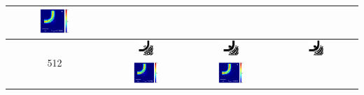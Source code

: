 \begin{table}[ht]
\begin{tabular}{|c|c|c|c|}
      \includegraphics[width=0.33\textwidth]{image/results/bend/L-BFGS-B/visualize_field_fab_256.png} \\
    \hline
      \multirow{2}{*}{512} &
      \includegraphics[width=0.20\textwidth]{image/results/bend/L-BFGS-B/visualize_eps_cont_512.png} &
      \includegraphics[width=0.20\textwidth]{image/results/bend/L-BFGS-B/visualize_eps_disc_512.png} &
      \includegraphics[width=0.20\textwidth]{image/results/bend/L-BFGS-B/visualize_eps_fab_512.png} \\
      \cline{2-4}
      &
      \includegraphics[width=0.33\textwidth]{image/results/bend/L-BFGS-B/visualize_field_cont_512.png} &
      \includegraphics[width=0.33\textwidth]{image/results/bend/L-BFGS-B/visualize_field_disc_512.png} &

\end{tabular}
\end{table}
